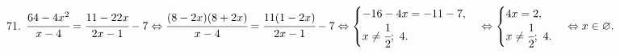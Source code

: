 71. $\cfrac{64-4x^2}{x-4}=\cfrac{11-22x}{2x-1}-7\Leftrightarrow
\cfrac{(8-2x)(8+2x)}{x-4}=\cfrac{11(1-2x)}{2x-1}-7\Leftrightarrow
\begin{cases} -16-4x=-11-7,\\ x\neq\cfrac{1}{2};\ 4.\end{cases}\Leftrightarrow
\begin{cases} 4x=2,\\ x\neq\cfrac{1}{2};\ 4.\end{cases}\Leftrightarrow x\in\varnothing.$\\
